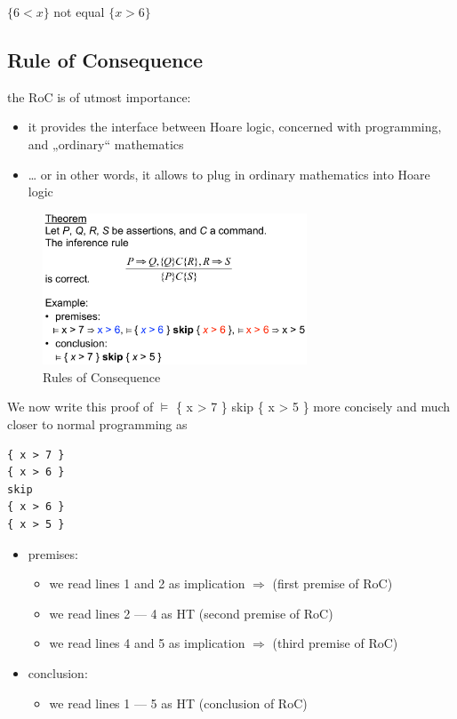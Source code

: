 \begin{tcolorbox}[colback=red!5!white,colframe=red!75!black]
$\{ 6 < x \}$ not equal $\{ x > 6 \}$
\end{tcolorbox}

\clearpage
\hypertarget{rule-of-consequence}{%
\subsection{Rule of Consequence}\label{rule-of-consequence}}

the RoC is of utmost importance:

\begin{itemize}
\tightlist
\item
  it provides the interface between Hoare logic, concerned with
  programming, and „ordinary`` mathematics
\item
  \ldots{} or in other words, it allows to plug in ordinary mathematics
  into Hoare logic
\end{itemize}

\begin{figure}[H]
\centering
\includegraphics[width=0.7\textwidth]{figures/rulesOfConsquence.png}
\caption{Rules of Consequence}
\end{figure}

We now write this proof of $\models$ \{ x \textgreater{} 7 \} skip \{ x
\textgreater{} 5 \} more concisely and much closer to normal programming
as

\begin{lstlisting}
{ x > 7 }
{ x > 6 }
skip
{ x > 6 }
{ x > 5 }
\end{lstlisting}

\begin{itemize}
\tightlist
\item
  premises:

  \begin{itemize}
  \tightlist
  \item
    we read lines 1 and 2 as implication $\Rightarrow$ (first premise of RoC)
  \item
    we read lines 2 --- 4 as HT (second premise of RoC)
  \item
    we read lines 4 and 5 as implication $\Rightarrow$ (third premise of RoC)
  \end{itemize}
\item
  conclusion:

  \begin{itemize}
  \tightlist
  \item
    we read lines 1 --- 5 as HT (conclusion of RoC)
  \end{itemize}
\end{itemize}

